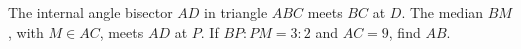 The internal angle bisector $ AD $ in triangle $ ABC $ meets $ BC $ at $ D $. The median $ BM $, with $ M\in AC $, meets $ AD $ at $ P $. If $ BP:PM=3:2 $ and $ AC=9 $, find $ AB $.

